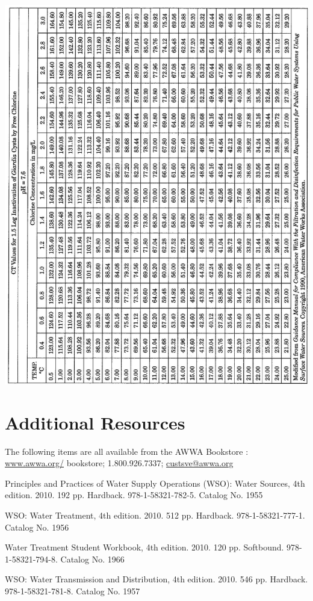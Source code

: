 \documentclass[10pt]{article}
\begin{document}
\includegraphics[max width=\textwidth]{2022_11_10_d6923b5a412978ed01fcg-62}

\section{Additional Resources}
The following items are all available from the AWWA Bookstore : \href{http://www.awwa.org/}{www.awwa.org/} bookstore; 1.800.926.7337; \href{mailto:custsve@awwa.org}{custsve@awwa.org}

Principles and Practices of Water Supply Operations (WSO): Water Sources, 4th edition. 2010. 192 pp. Hardback. 978-1-58321-782-5. Catalog No. 1955

WSO: Water Treatment, 4th edition. 2010. 512 pp. Hardback. 978-1-58321-777-1. Catalog No. 1956

Water Treatment Student Workbook, 4th edition. 2010. 120 pp. Softbound. 978-1-58321-794-8. Catalog No. 1966

WSO: Water Transmission and Distribution, 4th edition. 2010. 546 pp. Hardback. 978-1-58321-781-8. Catalog No. 1957
\end{document}
